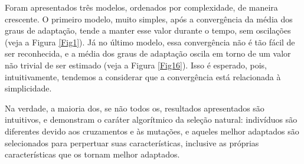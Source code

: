 \documentclass[10pt,brazil,english]{article}
\begin{document}
        Foram apresentados três modelos, ordenados por complexidade, de maneira crescente. O primeiro modelo, muito simples, após a convergência da média dos graus de adaptação, tende a manter esse valor durante o tempo, sem oscilações (veja a Figura \ref{Fig1}). Já no último modelo, essa convergência não é tão fácil de ser reconhecida, e a média dos graus de adaptação oscila em torno de um valor não trivial de ser estimado (veja a Figura \ref{Fig16}). Isso é esperado, pois, intuitivamente, tendemos a considerar que a convergência está relacionada à simplicidade.
        
        Na verdade, a maioria dos, se não todos os, resultados apresentados são intuitivos, e demonstram o caráter algorítmico da seleção natural: indivíduos são diferentes devido aos cruzamentos e às mutações, e aqueles melhor adaptados são selecionados para perpertuar suas características, inclusive as próprias características que os tornam melhor adaptados.
    
    
    
    \nocite{carykh2015}
\end{document}
